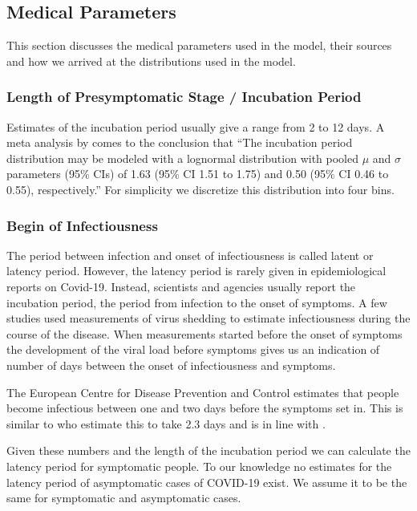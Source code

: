 \subsection{Medical Parameters}

This section discusses the medical parameters used in the model, their sources and how
we arrived at the distributions used in the model.\footnotemark



\subsubsection{Length of Presymptomatic Stage / Incubation Period}


Estimates of the incubation period usually give a range from 2 to 12 days. A meta
analysis by \citet{McAloon2020} comes to the conclusion that ``The incubation period
distribution may be modeled with a lognormal distribution with pooled $\mu$ and $\sigma$
parameters (95\% CIs) of 1.63 (95\% CI 1.51 to 1.75) and 0.50 (95\% CI 0.46 to 0.55),
respectively.'' For simplicity we discretize this distribution into four bins.


\subsubsection{Begin of Infectiousness}

The period between infection and onset of infectiousness is called latent or latency
period. However, the latency period is rarely given in epidemiological reports on
Covid-19. Instead, scientists and agencies usually report the incubation period, the
period from infection to the onset of symptoms. A few studies used measurements of virus
shedding to estimate infectiousness during the course of the disease. When measurements
started before the onset of symptoms the development of the viral load before symptoms
gives us an indication of number of days between the onset of infectiousness and
symptoms.

The European Centre for Disease Prevention and Control estimates that people become
infectious between one and two days before the symptoms set in. This is similar to
\citet{He2020} who estimate this to take 2.3 days and is in line with \citet{Peak2020}.

Given these numbers and the length of the incubation period we can calculate the latency
period for symptomatic people. To our knowledge no estimates for the latency period of
asymptomatic cases of COVID-19 exist. We assume it to be the same for symptomatic and
asymptomatic cases.


